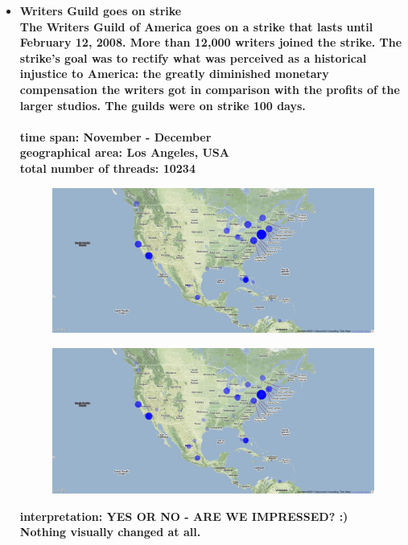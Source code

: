 \documentclass[11pt,a4paper,english]{article}
\begin{document}
\begin{itemize}
						
						
					\item \bf Writers Guild goes on strike \rm
						\\ The Writers Guild of America goes on a strike that lasts until February 12, 2008. More than 12,000 writers joined the strike. The strike's goal was to rectify what was perceived as a historical injustice to America: the greatly diminished monetary compensation the writers got in comparison with the profits of the larger studios. The guilds were on strike 100 days.
						\\\\ \bf time span: \rm November - December
						\\ \bf geographical area: \rm Los Angeles, USA
						\\ \bf total number of threads: \rm 10234
						\begin{figure}[H]
							\vspace{-13pt}
  							\begin{center}
								\includegraphics[width=130mm]{img/pre-writer}
							\end{center}
							\vspace{-13pt}
						\end{figure}
						\begin{figure}[H]
							\vspace{-13pt}
	  						\begin{center}
								\includegraphics[width=130mm]{img/post-writer}
							\end{center}
							\vspace{-13pt}
						\end{figure}	
						\bf interpretation: \rm YES OR NO - ARE WE IMPRESSED? :)
						\\ Nothing visually changed at all.
						
						
						
				\end{itemize}
			
\end{document}
